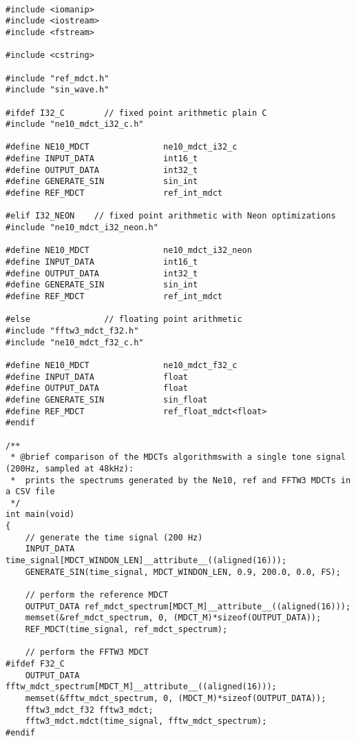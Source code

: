 \documentclass{article}
\begin{document}
\paragraph{}
\lstset{language=C++}
\begin{lstlisting}
#include <iomanip>
#include <iostream>
#include <fstream>

#include <cstring>

#include "ref_mdct.h"
#include "sin_wave.h"

#ifdef I32_C        // fixed point arithmetic plain C
#include "ne10_mdct_i32_c.h"

#define NE10_MDCT               ne10_mdct_i32_c
#define INPUT_DATA              int16_t
#define OUTPUT_DATA             int32_t
#define GENERATE_SIN            sin_int
#define REF_MDCT                ref_int_mdct

#elif I32_NEON    // fixed point arithmetic with Neon optimizations
#include "ne10_mdct_i32_neon.h"

#define NE10_MDCT               ne10_mdct_i32_neon
#define INPUT_DATA              int16_t
#define OUTPUT_DATA             int32_t
#define GENERATE_SIN            sin_int
#define REF_MDCT                ref_int_mdct

#else               // floating point arithmetic
#include "fftw3_mdct_f32.h"
#include "ne10_mdct_f32_c.h"

#define NE10_MDCT               ne10_mdct_f32_c
#define INPUT_DATA              float
#define OUTPUT_DATA             float
#define GENERATE_SIN            sin_float
#define REF_MDCT                ref_float_mdct<float>
#endif

/**
 * @brief comparison of the MDCTs algorithmswith a single tone signal (200Hz, sampled at 48kHz):
 *  prints the spectrums generated by the Ne10, ref and FFTW3 MDCTs in a CSV file
 */
int main(void)
{
    // generate the time signal (200 Hz)
    INPUT_DATA time_signal[MDCT_WINDON_LEN]__attribute__((aligned(16)));
    GENERATE_SIN(time_signal, MDCT_WINDON_LEN, 0.9, 200.0, 0.0, FS);

    // perform the reference MDCT
    OUTPUT_DATA ref_mdct_spectrum[MDCT_M]__attribute__((aligned(16)));
    memset(&ref_mdct_spectrum, 0, (MDCT_M)*sizeof(OUTPUT_DATA));
    REF_MDCT(time_signal, ref_mdct_spectrum);

    // perform the FFTW3 MDCT
#ifdef F32_C
    OUTPUT_DATA fftw_mdct_spectrum[MDCT_M]__attribute__((aligned(16)));
    memset(&fftw_mdct_spectrum, 0, (MDCT_M)*sizeof(OUTPUT_DATA));
    fftw3_mdct_f32 fftw3_mdct;
    fftw3_mdct.mdct(time_signal, fftw_mdct_spectrum);
#endif


\end{lstlisting}
\end{document}
